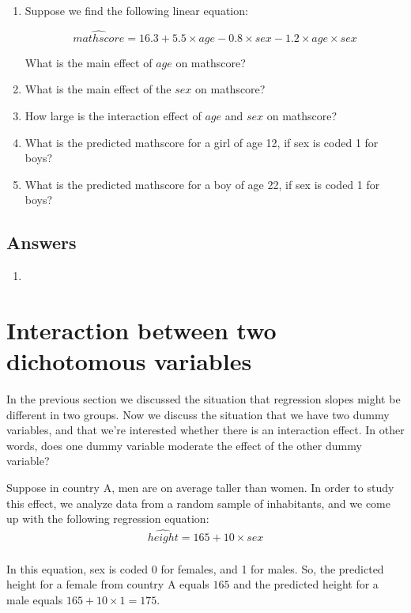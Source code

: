 \begin{enumerate}
\item Suppose we find the following linear equation:

\begin{equation} 
\widehat{mathscore} = 16.3 + 5.5  \times age - 0.8  \times sex - 1.2  \times age  \times sex  \nonumber
\end{equation}

What is the main effect of $age$ on mathscore? 
\item What is the main effect of the $sex$ on mathscore?
\item How large is the interaction effect of $age$ and $sex$ on mathscore?
\item What is the predicted mathscore for a girl of age 12, if sex is coded 1 for boys?
\item What is the predicted mathscore for a boy of age 22, if sex is coded 1 for boys?

\end{enumerate}

\subsection{Answers}
\begin{enumerate}
\item 
\end{enumerate}






\section{Interaction between two dichotomous variables}

In the previous section we discussed the situation that regression slopes might be different in two groups. Now we discuss the situation that we have two dummy variables, and that we're interested whether there is an interaction effect. In other words, does one dummy variable moderate the effect of the other dummy variable?

Suppose in country A, men are on average taller than women. In order to study this effect, we analyze data from a random sample of inhabitants, and we come up with the following regression equation:
\\
\begin{eqnarray} 
\widehat{height} = 165 + 10  \times sex  \nonumber
\end{eqnarray}
\\
In this equation, sex is coded 0 for females, and 1 for males. So, the predicted height for a female from country A equals $165$ and the predicted height for a male equals $165 + 10 \times 1 = 175$.\\



